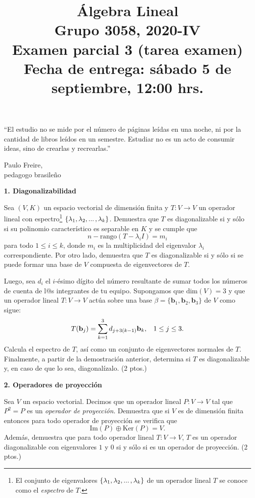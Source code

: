 \documentclass[a4paper]{article}
\begin{document}
\title{Álgebra Lineal \\ Grupo 3058, 2020-IV \\ Examen parcial 3 (tarea examen) \\ Fecha de entrega: sábado 5 de septiembre, 12:00 hrs.}
\date{}
\maketitle

\epigraph{``El estudio no se mide por el número de páginas leídas en una noche, ni por la cantidad de libros leídos en un semestre. Estudiar no es un acto de consumir ideas, sino de crearlas y recrearlas.''}{\textemdash Paulo Freire, \\ pedagogo brasileño}

\vspace{5mm}
\textbf{1. Diagonalizabilidad}

Sea $(V,K)$ un espacio vectorial de dimensión finita y $T:V\to V$ un operador lineal con espectro\footnote{El conjunto de eigenvalores $\{\lambda_1,\lambda_2,...\hspace{0.5mm},\lambda_k\}$ de un operador lineal $T$ se conoce como el \emph{espectro} de $T$.} $\{\lambda_1,\lambda_2,...\hspace{0.5mm},\lambda_k\}$. Demuestra que $T$ es diagonalizable si y sólo si su polinomio característico es separable en $K$ y se cumple que $$n-\text{rango}(T-\lambda_i I) = m_i$$ para todo $1\leq i\leq k$, donde $m_i$ es la multiplicidad del eigenvalor $\lambda_i$ correspondiente. Por otro lado, demuestra que $T$ es diagonalizable si y sólo si se puede formar una base de $V$ compuesta de eigenvectores de $T$.

Luego, sea $d_i$ el $i$-ésimo dígito del número resultante de sumar todos los números de cuenta de l@s integrantes de tu equipo. Supongamos que $\text{dim}(V)=3$ y que un operador lineal $T:V\to V$ actúa sobre una base $\beta=\{\mathbf{b}_1, \mathbf{b}_2,\mathbf{b}_3\}$ de $V$ como sigue: $$T(\mathbf{b}_j) = \sum_{k=1}^3 d_{j+3(k-1)}\mathbf{b}_k, \hspace{3mm} 1\leq j\leq 3.$$ Calcula el espectro de $T$, así como un conjunto de eigenvectores normales de $T$. Finalmente, a partir de la demostración anterior, determina si $T$ es diagonalizable y, en caso de que lo sea, diagonalízalo. (2 ptos.)

\vspace{5mm}
\textbf{2. Operadores de proyección}

Sea $V$ un espacio vectorial. Decimos que un operador lineal $P:V\to V$ tal que $P^2 = P$ es un \emph{operador de proyección}. Demuestra que si $V$ es de dimensión finita entonces para todo operador de proyección se verifica que $$\text{Im}(P)\oplus\text{Ker}(P)=V.$$ Además, demuestra que para todo operador lineal $T:V\to V$, $T$ es un operador diagonalizable con eigenvalores $1$ y $0$ si y sólo si es un operador de proyección. (2 ptos.)
\end{document}
